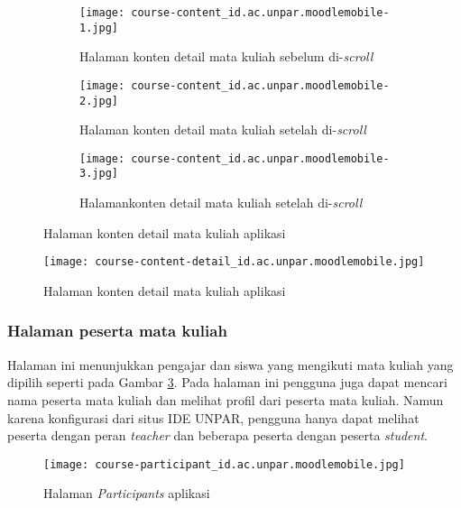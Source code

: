 \begin{figure}[H] 
	\centering 
	\begin{subfigure}[ht]{.3\textwidth}
	\centering
	\texttt{[image: course-content\_id.ac.unpar.moodlemobile-1.jpg]}  
	\caption{Halaman konten detail mata kuliah sebelum di-\textit{scroll}}
	\end{subfigure}
	\hfill
	\begin{subfigure}[ht]{.3\textwidth}
	\centering
	\texttt{[image: course-content\_id.ac.unpar.moodlemobile-2.jpg]}  
	\caption{Halaman konten detail mata kuliah setelah di-\textit{scroll}}
	\end{subfigure}
	\hfill
	\begin{subfigure}[ht]{.3\textwidth}
	\centering
	\texttt{[image: course-content\_id.ac.unpar.moodlemobile-3.jpg]}  
	\caption{Halamankonten detail mata kuliah setelah di-\textit{scroll}}
	\end{subfigure} 
	\caption[Halaman konten detail mata kuliah aplikasi] {Halaman konten detail mata kuliah aplikasi} 
	\label{app:content} 
\end{figure}  

\begin{figure}[H] 
	\centering  
	\texttt{[image: course-content-detail\_id.ac.unpar.moodlemobile.jpg]}  
	\caption[Halaman konten detail mata kuliah aplikasi] {Halaman konten detail mata kuliah aplikasi} 
	\label{app:content:detail} 
\end{figure}  

\subsubsection{Halaman peserta mata kuliah}

Halaman ini menunjukkan pengajar dan siswa yang mengikuti mata kuliah yang dipilih seperti pada Gambar \ref{app:participants}. Pada halaman ini pengguna juga dapat mencari nama peserta mata kuliah dan melihat profil dari peserta mata kuliah. Namun karena konfigurasi dari situs IDE UNPAR, pengguna hanya dapat melihat peserta dengan peran \textit{teacher} dan beberapa peserta dengan peserta \textit{student}. 

\begin{figure}[H] 
	\centering  
	\texttt{[image: course-participant\_id.ac.unpar.moodlemobile.jpg]}  
	\caption[Halaman \textit{Participants} aplikasi] {Halaman \textit{Participants} aplikasi} 
	\label{app:participants} 
\end{figure}  

